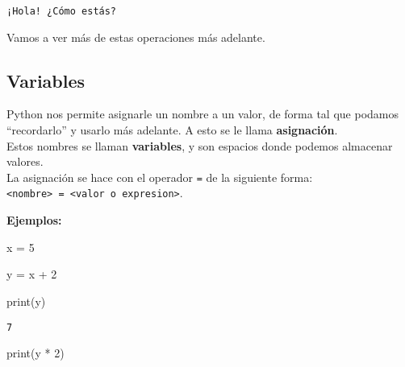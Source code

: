 \documentclass[
  letterpaper,
  DIV=11,
  numbers=noendperiod]{scrreprt}
\newenvironment{Shaded}{\begin{snugshade}}{\end{snugshade}}
\newcommand{\BuiltInTok}[1]{\textcolor[rgb]{0.00,0.23,0.31}{#1}}
\newcommand{\DecValTok}[1]{\textcolor[rgb]{0.68,0.00,0.00}{#1}}
\newcommand{\NormalTok}[1]{\textcolor[rgb]{0.00,0.23,0.31}{#1}}
\newcommand{\OperatorTok}[1]{\textcolor[rgb]{0.37,0.37,0.37}{#1}}
\begin{document}
\begin{verbatim}
¡Hola! ¿Cómo estás?
\end{verbatim}

Vamos a ver más de estas operaciones más adelante.

\subsection{Variables}\label{variables}

Python nos permite asignarle un nombre a un valor, de forma tal que
podamos ``recordarlo'' y usarlo más adelante. A esto se le llama
\textbf{asignación}.\\
Estos nombres se llaman \textbf{variables}, y son espacios donde podemos
almacenar valores.\\

La asignación se hace con el operador \texttt{=} de la siguiente forma:
\texttt{\textless{}nombre\textgreater{}\ =\ \textless{}valor\ o\ expresion\textgreater{}}.

\textbf{Ejemplos:}

\begin{Shaded}
\begin{Highlighting}[]
\NormalTok{x }\OperatorTok{=} \DecValTok{5}
\end{Highlighting}
\end{Shaded}

\begin{Shaded}
\begin{Highlighting}[]
\NormalTok{y }\OperatorTok{=}\NormalTok{ x }\OperatorTok{+} \DecValTok{2}
\end{Highlighting}
\end{Shaded}

\begin{Shaded}
\begin{Highlighting}[]
\BuiltInTok{print}\NormalTok{(y)}
\end{Highlighting}
\end{Shaded}

\begin{verbatim}
7
\end{verbatim}

\begin{Shaded}
\begin{Highlighting}[]
\BuiltInTok{print}\NormalTok{(y }\OperatorTok{*} \DecValTok{2}\NormalTok{)}
\end{Highlighting}
\end{Shaded}
\end{document}
